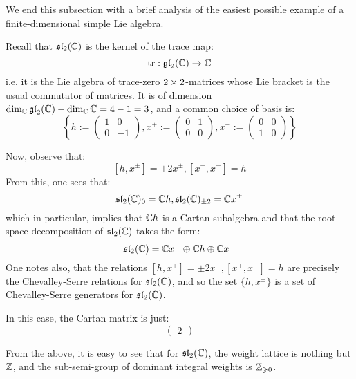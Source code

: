         We end this subsection with a brief analysis of the easiest possible example of a finite-dimensional simple Lie algebra. 
        \begin{example}[$\sl_2(\bbC)$] \label{example: sl_2}
            Recall that $\sl_2(\bbC)$ is the kernel of the trace map:
                $$\operatorname{tr}: \mathfrak{gl}_2(\mathbb{C}) \to \mathbb{C}$$
            i.e. it is the Lie algebra of trace-zero $2 \x 2$-matrices whose Lie bracket is the usual commutator of matrices. It is of dimension $\dim_{\mathbb{C}} \mathfrak{gl}_2(\mathbb{C}) - \dim_{\mathbb{C}} \mathbb{C} = 4 - 1 = 3$, and a common choice of basis is:
                $$\left\{ h := \begin{pmatrix} 1 & 0 \\ 0 & -1 \end{pmatrix}, x^+ := \begin{pmatrix} 0 & 1 \\ 0 & 0 \end{pmatrix}, x^- := \begin{pmatrix} 0 & 0 \\ 1 & 0 \end{pmatrix} \right\}$$
                
            Now, observe that:
                $$[h, x^{\pm}] = \pm 2 x^{\pm}, [x^+, x^-] = h$$
            From this, one sees that:
                $$\mathfrak{sl}_2(\mathbb{C})_0 = \mathbb{C} h, \mathfrak{sl}_2(\mathbb{C})_{\pm 2} = \mathbb{C} x^{\pm}$$
            which in particular, implies that $\mathbb{C} h$ is a Cartan subalgebra and that the root space decomposition of $\sl_2(\bbC)$ takes the form:
                $$\mathfrak{sl}_2(\mathbb{C}) = \mathbb{C} x^- \oplus \mathbb{C} h \oplus \mathbb{C} x^+$$
            One notes also, that the relations $[h, x^{\pm}] = \pm 2 x^{\pm}, [x^+, x^-] = h$ are precisely the Chevalley-Serre relations for $\sl_2(\bbC)$, and so the set $\{h, x^{\pm}\}$ is a set of Chevalley-Serre generators for $\sl_2(\bbC)$.
            
            In this case, the Cartan matrix is just:
                $$\begin{pmatrix} 2 \end{pmatrix}$$

            From the above, it is easy to see that for $\sl_2(\bbC)$, the weight lattice is nothing but $\mathbb{Z}$, and the sub-semi-group of dominant integral weights is $\mathbb{Z}_{\geqslant 0}$.
        \end{example}

